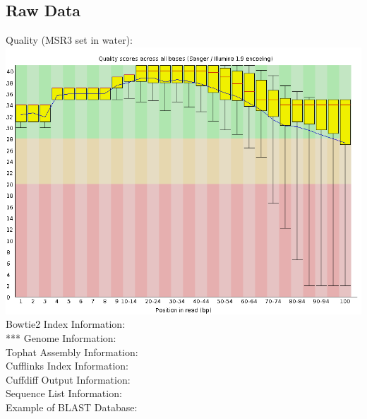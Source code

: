 \documentclass{article}
\begin{document}
\subsection{Raw Data}
\begin{center}	
Quality (MSR3 set in water): \\
\includegraphics[scale=0.3]{msr3_h20_r1_basequal.png} \\




Bowtie2 Index Information: \\

*** Genome Information: \\

Tophat Assembly Information: \\

Cufflinks Index Information: \\

Cuffdiff Output Information: \\

Sequence List Information: \\

Example of BLAST Database:
\end{center}
	
\end{document}
